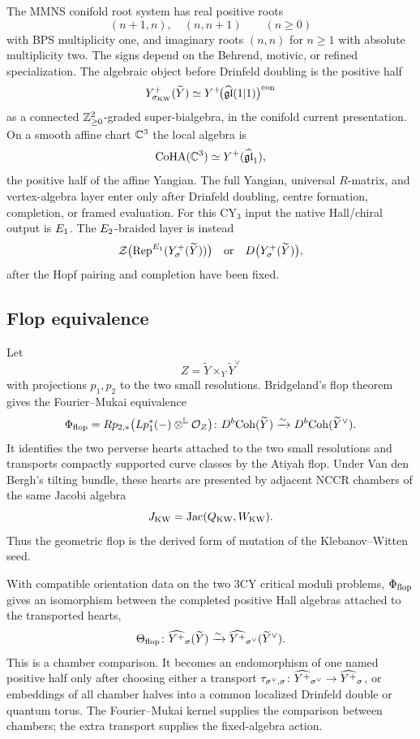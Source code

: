 The MMNS conifold root system has real positive roots
\[
  (n+1,n),\quad (n,n+1) \qquad (n\ge 0)
\]
with BPS multiplicity one, and imaginary roots $(n,n)$ for $n\geq 1$
with absolute multiplicity two.  The signs depend on the Behrend,
motivic, or refined specialization.  The algebraic object before
Drinfeld doubling is the positive half
\[
  Y^{+}_{\sigma_{\mathrm{KW}}}(\widetilde Y)
  \simeq
  Y^+\!\bigl(\widehat{\mathfrak{gl}}(1|1)\bigr)^{\mathrm{con}}
\]
as a connected $\mathbb{Z}_{\geq0}^{2}$-graded super-bialgebra, in the conifold
current presentation.  On a smooth affine chart $\mathbb{C}^3$ the local algebra
is
\[
  \mathrm{CoHA}(\mathbb{C}^3)\simeq Y^+(\widehat{\mathfrak{gl}}_{1}),
\]
the positive half of the affine Yangian.  The full Yangian, universal
$R$-matrix, and vertex-algebra layer enter only after Drinfeld doubling,
centre formation, completion, or framed evaluation.  For this CY$_3$
input the native Hall/chiral output is $E_{1}$.  The $E_{2}$-braided
layer is instead
\[
  \mathcal{Z}\bigl(\mathrm{Rep}^{E_{1}}(Y^{+}_\sigma(\widetilde Y))\bigr)
  \quad\text{or}\quad
  D\bigl(Y^{+}_\sigma(\widetilde Y)\bigr),
\]
after the Hopf pairing and completion have been fixed.

\subsection*{Flop equivalence}

Let
\[
  Z=\widetilde Y\times_Y\widetilde Y^\vee
\]
with projections $p_1,p_2$ to the two small resolutions.  Bridgeland's
flop theorem gives the Fourier--Mukai equivalence
\[
  \Phi_{\mathrm{flop}} =
  Rp_{2,*}\bigl(Lp_1^*(-)\otimes^{\mathbb L}\mathcal{O}_Z\bigr)
  \colon
  D^{b}\mathrm{Coh}(\widetilde Y)\xrightarrow{\sim}
  D^{b}\mathrm{Coh}(\widetilde Y^\vee).
\]
It identifies the two perverse hearts attached to the two small
resolutions and transports compactly supported curve classes by the
Atiyah flop.  Under Van den Bergh's tilting bundle, these hearts are
presented by adjacent NCCR chambers of the same Jacobi algebra
\[
  J_{\mathrm{KW}}=\mathrm{Jac}(Q_{\mathrm{KW}},W_{\mathrm{KW}}).
\]
Thus the geometric flop is the derived form of mutation of the
Klebanov--Witten seed.

With compatible orientation data on the two $3$CY critical moduli
problems, $\Phi_{\mathrm{flop}}$ gives an isomorphism between the completed positive
Hall algebras attached to the transported hearts,
\[
  \Theta_{\mathrm{flop}}\colon
  \widehat{Y^{+}}_{\sigma}(\widetilde Y)
  \xrightarrow{\sim}
  \widehat{Y^{+}}_{\sigma^\vee}(\widetilde Y^\vee).
\]
This is a chamber comparison.  It becomes an endomorphism of one named
positive half only after choosing either a transport
$\tau_{\sigma^\vee,\sigma}\colon
\widehat{Y^{+}}_{\sigma^\vee}\to\widehat{Y^{+}}_{\sigma}$, or
embeddings of all chamber halves into a common localized Drinfeld
double or quantum torus.  The Fourier--Mukai kernel supplies the
comparison between chambers; the extra transport supplies the
fixed-algebra action.

